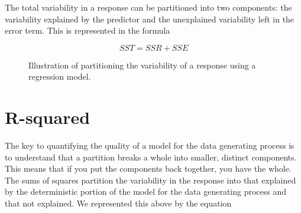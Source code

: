 \documentclass[
  letterpaper,
  DIV=11,
  numbers=noendperiod]{scrreprt}
\theoremstyle{plain}
\theoremstyle{definition}
\theoremstyle{definition}
\theoremstyle{remark}
\begin{document}
\begin{tcolorbox}[enhanced jigsaw, breakable, titlerule=0mm, colframe=quarto-callout-tip-color-frame, bottomtitle=1mm, opacityback=0, rightrule=.15mm, toptitle=1mm, arc=.35mm, bottomrule=.15mm, left=2mm, title=\textcolor{quarto-callout-tip-color}{\faLightbulb}\hspace{0.5em}{Big Idea}, leftrule=.75mm, coltitle=black, toprule=.15mm, colbacktitle=quarto-callout-tip-color!10!white, colback=white, opacitybacktitle=0.6]

The total variability in a response can be partitioned into two
components: the variability explained by the predictor and the
unexplained variability left in the error term. This is represented in
the formula

\[SST = SSR + SSE\]

\end{tcolorbox}

\begin{figure}


\caption{\label{fig-regquality-partition-variability}Illustration of
partitioning the variability of a response using a regression model.}

\end{figure}%

\section{R-squared}\label{r-squared}

The key to quantifying the quality of a model for the data generating
process is to understand that a partition breaks a whole into smaller,
distinct components. This means that if you put the components back
together, you have the whole. The sums of squares partition the
variability in the response into that explained by the deterministic
portion of the model for the data generating process and that not
explained. We represented this above by the equation
\end{document}
